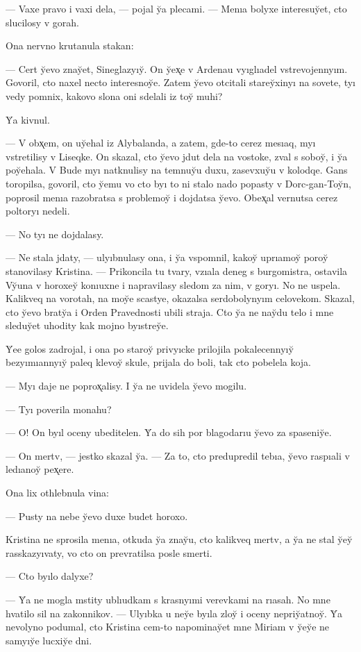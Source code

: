 \documentclass[10pt]{book}
\begin{document}
— Vaxe pravo i vaxi dela, — pojal y̆a plecami. — Menıa bolyxe interesuy̆et, cto slucilosy v gorah.

Ona nervno krutanula stakan:

— Cert y̆evo znay̆et, Sineglazyıy̆. On y̆ex̨e v Ardenau vyıglıadel vstrevojennyım. Govoril, cto naxel necto interesnoy̆e. Zatem y̆evo otcitali starey̆xinyı na sovete, tyı vedy pomnix, kakovo slona oni sdelali iz toy̆ muhi?

Y̆a kivnul.

— V obx̨em, on uy̆ehal iz Alybalanda, a zatem, gde-to cerez mesıaq, myı vstretilisy v Liseqke. On skazal, cto y̆evo jdut dela na vostoke, zval s soboy̆, i y̆a poy̆ehala. V Bude myı natknulisy na temnuy̆u duxu, zasevxuy̆u v kolodqe. Gans toropilsa, govoril, cto y̆emu vo cto byı to ni stalo nado popasty v Dorc-gan-Toy̆n, poprosil menıa razobratsa s problemoy̆ i dojdatsa y̆evo. Obex̨al vernutsa cerez poltoryı nedeli.

— No tyı ne dojdalasy.

— Ne stala jdaty, — ulyıbnulasy ona, i y̆a vspomnil, kakoy̆ uprıamoy̆ poroy̆ stanovilasy Kristina. — Prikoncila tu tvary, vzıala deneg s burgomistra, ostavila Vy̆una v horoxey̆ konıuxne i napravilasy sledom za nim, v goryı. No ne uspela. Kalikveq na vorotah, na moy̆e scastye, okazalsa serdobolynyım celovekom. Skazal, cto y̆evo braty̆a i Orden Pravednosti ubili straja. Cto y̆a ne nay̆du telo i mne sleduy̆et uhodity kak mojno byıstrey̆e.

Y̆ee golos zadrojal, i ona po staroy̆ privyıcke prilojila pokalecennyıy̆ bezyımıannyıy̆ paleq klevoy̆ skule, prijala do boli, tak cto pobelela koja.

— Myı daje ne poprox̨alisy. I y̆a ne uvidela y̆evo mogilu.

— Tyı poverila monahu?

— O! On byıl oceny ubeditelen. Y̆a do sih por blagodarıu y̆evo za spaseniy̆e.

— On mertv, — jestko skazal y̆a. — Za to, cto predupredil tebıa, y̆evo raspıali v ledıanoy̆ pex̨ere.

Ona lix othlebnula vina:

— Pusty na nebe y̆evo duxe budet horoxo.

Kristina ne sprosila menıa, otkuda y̆a znay̆u, cto kalikveq mertv, a y̆a ne stal y̆ey̆ rasskazyıvaty, vo cto on prevratilsa posle smerti.

— Cto byılo dalyxe?

— Y̆a ne mogla mstity ublıudkam s krasnyımi verevkami na rıasah. No mne hvatilo sil na zakonnikov. — Ulyıbka u ney̆e byıla zloy̆ i oceny nepriy̆atnoy̆. Y̆a nevolyno podumal, cto Kristina cem-to napominay̆et mne Miriam v y̆ey̆e ne samyıy̆e lucxiy̆e dni.
\end{document}
